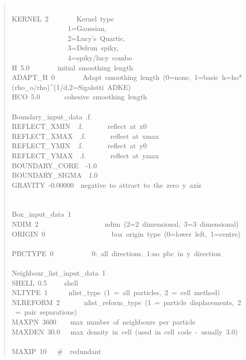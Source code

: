 \begin{quote}
{~\\
KERNEL~2~~~~~~~~Kernel~type~\\
~~~~~~~~~~~~~~~~1=Gaussian,~\\
~~~~~~~~~~~~~~~~2=Lucy's~Quartic,~\\
~~~~~~~~~~~~~~~~3=Delrun~spiky,~\\
~~~~~~~~~~~~~~~~4=spiky/lucy~combo~\\
H~5.0~~~~~~~~initial~smoothing~length~\\
ADAPT{\_}H~0~~~~~~~~Adapt~smoothing~length~(0=none,~1=basic~h=ho*(rho{\_}o/rho){\textasciicircum}(1/d,2=Sigalotti~ADKE)~\\
HCO~5.0~~~~~~~cohesive~smoothing~length~\\
~\\
Boundary{\_}input{\_}data~.f.~\\
REFLECT{\_}XMIN~~.f.~~~~~~~reflect~at~x0~\\
REFLECT{\_}XMAX~~.f.~~~~~~~reflect~at~xmax~\\
REFLECT{\_}YMIN~~.f.~~~~~~~reflect~at~y0~\\
REFLECT{\_}YMAX~~.f.~~~~~~~reflect~at~ymax~\\
BOUNDARY{\_}CORE~~-1.0~\\
BOUNDARY{\_}SIGMA~~1.0~\\
GRAVITY~-0.00000~~negative~to~attract~to~the~zero~y~axis~\\
~\\
~\\
Box{\_}input{\_}data~1~\\
NDIM~2~~~~~~~~~~~~~~~~~~~ndim~(2=2~dimensional,~3=3~dimensional)~\\
ORIGIN~0~~~~~~~~~~~~~~~~~~~box~origin~type~(0=lower~left,~1=centre)~\\
PBCTYPE~0~~~~~~~~~~~0:~all~directions,~1:no~pbc~in~y~direction~\\
~\\
Neighbour{\_}list{\_}input{\_}data~1~\\
SHELL~0.5~~~~~shell~\\
NLTYPE~1~~~~~~nlist{\_}type~(1~=~all~particles,~2~=~cell~method)~\\
NLREFORM~2~~~~~~~nlist{\_}reform{\_}type~(1~=~particle~displacements,~2~=~pair~separations)~\\
MAXPN~3600~~~~max~number~of~neighbours~per~particle~\\
MAXDEN~30.0~~~max~density~in~cell~(used~in~cell~code~-~usually~3.0)~\\
~\\
MAXIP~10~~~{\#}~~redundant
}\end{quote}
